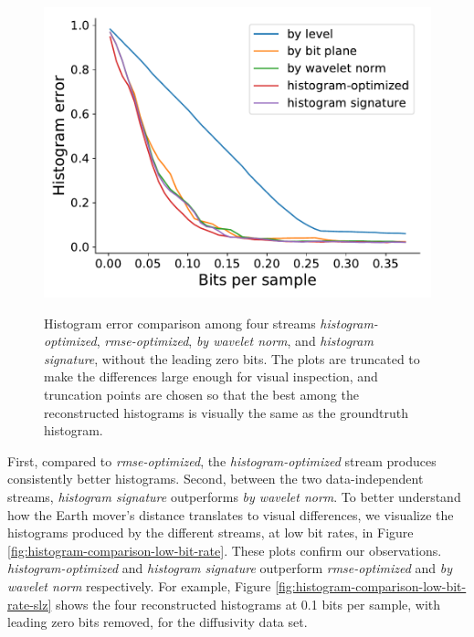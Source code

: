\begin{figure}
	{\includegraphics[width=0.48\linewidth]{img/histogram/histogram-optimized-velocityz.pdf}}
	\caption{Histogram error comparison among four streams \emph{histogram-optimized},
	\emph{rmse-optimized}, \emph{by wavelet norm}, and \emph{histogram signature}, without the leading
	zero bits. The plots are truncated to make the differences large enough for visual inspection, and
	truncation points are chosen so that the best among the reconstructed histograms is visually the
	same as the groundtruth histogram. }
	\label{fig:histogram-stream-comparison}
\end{figure}

First, compared to \emph{rmse-optimized}, the \emph{histogram-optimized} stream produces
consistently better histograms. Second, between the two data-independent streams, \emph{histogram
signature} outperforms \emph{by wavelet norm}. To better understand how the Earth mover's distance
translates to visual differences, we visualize the histograms produced by the different streams, at
low bit rates, in Figure \ref{fig:histogram-comparison-low-bit-rate}. These plots confirm our
observations.
\emph{histogram-optimized} and \emph{histogram signature}
outperform \emph{rmse-optimized} and \emph{by wavelet norm} respectively. For example, Figure
\ref{fig:histogram-comparison-low-bit-rate-slz} shows the four reconstructed histograms at 0.1 bits
per sample, with leading zero bits removed, for the diffusivity data set.

